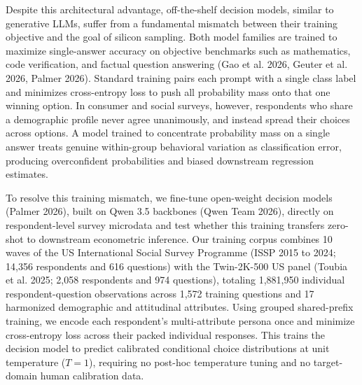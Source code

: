 \documentclass[
  letterpaper,
  DIV=11,
  numbers=noendperiod]{scrartcl}
\begin{document}
Despite this architectural advantage, off-the-shelf decision models,
similar to generative LLMs, suffer from a fundamental mismatch between
their training objective and the goal of silicon sampling. Both model
families are trained to maximize single-answer accuracy on objective
benchmarks such as mathematics, code verification, and factual question
answering (Gao et al. 2026, Geuter et al. 2026, Palmer 2026). Standard
training pairs each prompt with a single class label and minimizes
cross-entropy loss to push all probability mass onto that one winning
option. In consumer and social surveys, however, respondents who share a
demographic profile never agree unanimously, and instead spread their
choices across options. A model trained to concentrate probability mass
on a single answer treats genuine within-group behavioral variation as
classification error, producing overconfident probabilities and biased
downstream regression estimates.

To resolve this training mismatch, we fine-tune open-weight decision
models (Palmer 2026), built on Qwen 3.5 backbones (Qwen Team 2026),
directly on respondent-level survey microdata and test whether this
training transfers zero-shot to downstream econometric inference. Our
training corpus combines 10 waves of the US International Social Survey
Programme (ISSP 2015 to 2024; 14,356 respondents and 616 questions) with
the Twin-2K-500 US panel (Toubia et al. 2025; 2,058 respondents and 974
questions), totaling 1,881,950 individual respondent-question
observations across 1,572 training questions and 17 harmonized
demographic and attitudinal attributes. Using grouped shared-prefix
training, we encode each respondent's multi-attribute persona once and
minimize cross-entropy loss across their packed individual responses.
This trains the decision model to predict calibrated conditional choice
distributions at unit temperature (\(T = 1\)), requiring no post-hoc
temperature tuning and no target-domain human calibration data.
\end{document}

